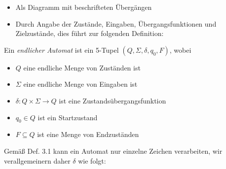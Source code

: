 \documentclass[11pt, a4paper]{article}
\begin{document}
\begin{flushleft}
    \begin{itemize}[-]
        \item Als Diagramm mit beschrifteten Übergängen 
        \item Durch Angabe der Zustände, Eingaben, Übergangsfunktionen und Zielzustände, dies führt zur folgenden Definition:
    \end{itemize}

    \begin{tcolorbox}[title = Definition 3.1]
        Ein \emph{endlicher Automat} ist ein 5-Tupel \((Q, \Sigma, \delta, q_0, F)\), wobei
        \begin{itemize}[-]
            \item \(Q\) eine endliche Menge von Zuständen ist
            \item \(\Sigma\) eine endliche Menge von Eingaben ist
            \item \(\delta: Q \times \Sigma \rightarrow Q\) ist eine Zustandsübergangsfunktion
            \item \(q_0 \in Q\) ist ein Startzustand
            \item \(F \subseteq Q\) ist eine Menge von Endzuständen
        \end{itemize}
    \end{tcolorbox}

    Gemäß Def. 3.1 kann ein Automat nur einzelne Zeichen verarbeiten, wir verallgemeinern daher \(\delta\) wie folgt:


\end{flushleft}
\end{document}

